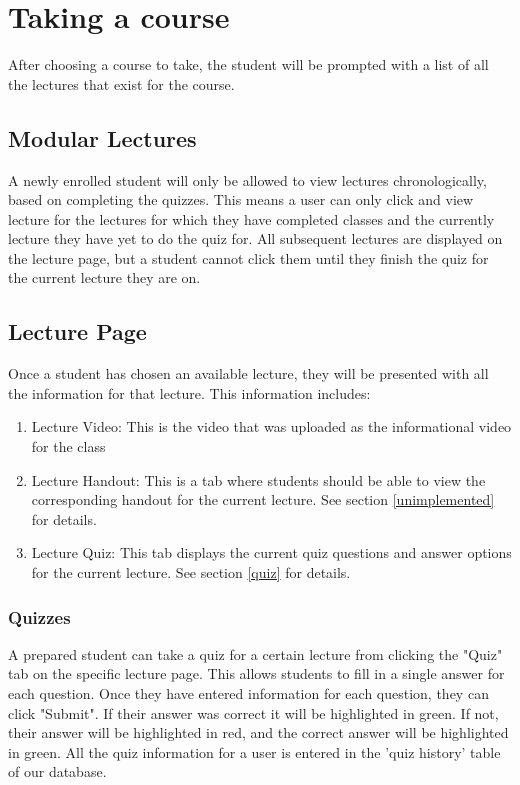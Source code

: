 \documentclass[12pt]{article}
\begin{document}
\section{Taking a course}
After choosing a course to take, the student will be prompted with a list of all the lectures that exist for the course.
\subsection{Modular Lectures}
A newly enrolled student will only be allowed to view lectures chronologically, based on completing the quizzes. This means a user can only click and view lecture for the lectures for which they have completed classes and the currently lecture they have yet to do the quiz for. All subsequent lectures are displayed on the lecture page, but a student cannot click them until they finish the quiz for the current lecture they are on.
\subsection{Lecture Page}
Once a student has chosen an available lecture, they will be presented with all the information for that lecture. This information includes:
\begin{enumerate}
\item Lecture Video: This is the video that was uploaded as the informational video for the class
\item Lecture Handout: This is a tab where students should be able to view the corresponding handout for the current lecture. See section \ref{unimplemented} for details.
\item Lecture Quiz: This tab displays the current quiz questions and answer options for the current lecture. See section \ref{quiz} for details.
\end{enumerate}
\subsubsection{Quizzes\label{quiz}}
A prepared student can take a quiz for a certain lecture from clicking the "Quiz" tab on the specific lecture page. This allows students to fill in a single answer for each question. Once they have entered information for each question, they can click "Submit". If their answer was correct it will be highlighted in green. If not, their answer will be highlighted in red, and the correct answer will be highlighted in green. All the quiz information for a user is entered in the 'quiz history' table of our database.
\end{document}
